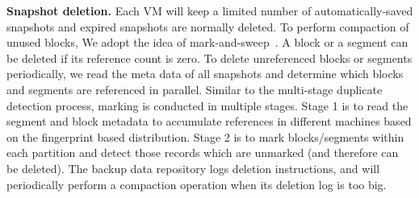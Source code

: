{\bf Snapshot deletion.} Each VM will keep a limited number of  automatically-saved snapshots and 
expired snapshots are normally deleted.
To perform compaction of unused blocks, We adopt the idea of mark-and-sweep~\cite{Guo2011}. 
A block or a segment can be deleted if its reference count is zero.
To delete unreferenced blocks or segments periodically, we read the meta data  of all
snapshots and determine which blocks and segments are referenced  in parallel.
Similar to the multi-stage duplicate detection process, marking is conducted in multiple stages. 
Stage  1 is to read  the segment and block  metadata 
to accumulate  references in different machines  based on the fingerprint based distribution.
Stage   2 is to mark blocks/segments within each partition and detect those records which are unmarked (and therefore can be deleted).
The backup  data repository logs deletion instructions,  and will periodically perform a compaction operation when 
its deletion log is too big. 




